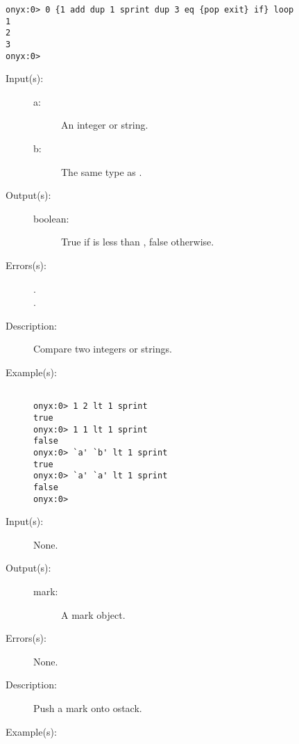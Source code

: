 \begin{description}
\begin{description}
\begin{verbatim}
onyx:0> 0 {1 add dup 1 sprint dup 3 eq {pop exit} if} loop
1
2
3
onyx:0>
		\end{verbatim}
	\end{description}
\label{systemdict:lt}
\item[{\onyxop{a b}{lt}{boolean}}: ]
	\begin{description}\item[]
	\item[Input(s): ]
		\begin{description}\item[]
		\item[a: ]
			An integer or string.
		\item[b: ]
			The same type as .
		\end{description}
	\item[Output(s): ]
		\begin{description}\item[]
		\item[boolean: ]
			True if  is less than , false
			otherwise.
		\end{description}
	\item[Errors(s): ]
		\begin{description}\item[]
		\item[.]
		\item[.]
		\end{description}
	\item[Description: ]
		Compare two integers or strings.
	\item[Example(s): ]\begin{verbatim}

onyx:0> 1 2 lt 1 sprint
true
onyx:0> 1 1 lt 1 sprint
false
onyx:0> `a' `b' lt 1 sprint
true
onyx:0> `a' `a' lt 1 sprint
false
onyx:0>
		\end{verbatim}
	\end{description}
\label{systemdict:mark}
\item[{\onyxop{--}{mark}{mark}}: ]
	\begin{description}\item[]
	\item[Input(s): ] None.
	\item[Output(s): ]
		\begin{description}\item[]
		\item[mark: ]
			A mark object.
		\end{description}
	\item[Errors(s): ] None.
	\item[Description: ]
		Push a mark onto ostack.
	\item[Example(s): ]\begin{verbatim}


\end{verbatim}
\end{description}
\end{description}
